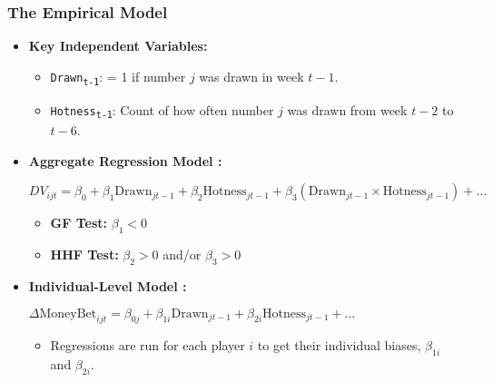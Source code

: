 \documentclass{beamer}
\begin{document}
\begin{frame}
    \frametitle{The Empirical Model}
    \begin{itemize}
        \item \textbf{Key Independent Variables:}
        \begin{itemize}
            \item \texttt{Drawn\textsubscript{t-1}}: = 1 if number $j$ was drawn in week $t-1$.
            \item \texttt{Hotness\textsubscript{t-1}}: Count of how often number $j$ was drawn from week $t-2$ to $t-6$.
        \end{itemize}
        \vspace{1em}
        \item \textbf{Aggregate Regression Model :}
        \begin{center}
        \small
        $DV_{ijt} = \beta_0 + \beta_1 \text{Drawn}_{jt-1} + \beta_2 \text{Hotness}_{jt-1} + \beta_3 (\text{Drawn}_{jt-1} \times \text{Hotness}_{jt-1}) + \dots$
        \end{center}
        \begin{itemize}
            \item \textbf{GF Test:} $\beta_1 < 0$
            \item \textbf{HHF Test:} $\beta_2 > 0$ and/or $\beta_3 > 0$
        \end{itemize}
        \vspace{1em}
        \item \textbf{Individual-Level Model :}
        \begin{center}
        \small
        $\Delta \text{MoneyBet}_{ijt} = \beta_{0j} + \beta_{1i} \text{Drawn}_{jt-1} + \beta_{2i} \text{Hotness}_{jt-1} + \dots$
        \end{center}
        \begin{itemize}
            \item Regressions are run for each player $i$ to get their individual biases, $\beta_{1i}$ and $\beta_{2i}$.
        \end{itemize}
    \end{itemize}
\end{frame}
\end{document}
